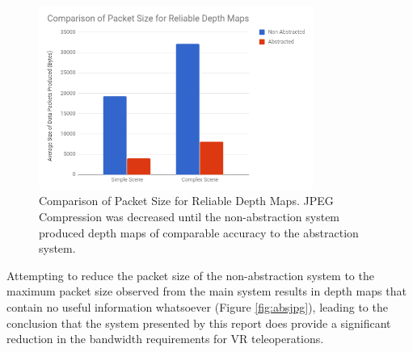 \begin{figure}[H]
    \begin{center}
      \includegraphics[width=0.8\textwidth]{Figures/packetcomp.png}
      \caption[Comparison of Packet Size for Reliable Depth Maps]{Comparison of Packet Size for Reliable Depth Maps. JPEG Compression was decreased until the non-abstraction system produced depth maps of comparable accuracy to the abstraction system.}
      \label{fig:packetc}
    \end{center}
\end{figure}

Attempting to reduce the packet size of the non-abstraction system to the maximum packet size observed from the main system results in depth maps that contain no useful information whatsoever (Figure \ref{fig:absjpg}), leading to the conclusion that the system presented by this report does provide a significant reduction in the bandwidth requirements for VR teleoperations.

